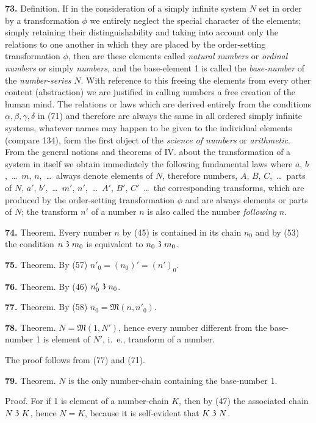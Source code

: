 \documentclass[oneside]{book}
\newcommand\partof{\mathrel{\raisebox{0.45ex}{$\mathfrak{3}$}}}   %
\newcommand\mypara{\medskip\textbf}
\begin{document}
\mypara{73.} Definition. If in the consideration of a simply
infinite system $N$ set in order by a transformation $\phi$
we entirely neglect the special character of the elements;
simply retaining their distinguishability and
taking into account only the relations to one another
in which they are placed by the order-setting transformation
$\phi$, then are these elements called \textit{natural
numbers} or \textit{ordinal numbers} or simply \textit{numbers}, and the
base-element 1 is called the \textit{base-number} of the \textit{number-series}
$N$. With reference to this freeing the elements
from every other content (abstraction) we are justified
in calling numbers a free creation of the human mind.
The relations or laws which are derived entirely from
the conditions $\alpha, \beta, \gamma, \delta$ in (71) and therefore are always
the same in all ordered simply infinite systems,
whatever names may happen to be given to the individual
elements (compare 134), form the first object of
the \textit{science of numbers} or \textit{arithmetic}. From the general
notions and theorems of IV. about the transformation
of a system in itself we obtain immediately the following
fundamental laws where $a$, $b$,~\ldots\ $m$, $n$,~\ldots\ always
denote elements of $N$, therefore numbers, $A$, $B$, $C$,~\ldots\
parts of $N$, $a'$, $b'$,~\ldots\ $m'$, $n'$,~\ldots\ $A'$, $B'$, $C'$~\ldots\ the
corresponding transforms, which are produced by the
order-setting transformation $\phi$ and are always elements
or parts of $N$; the transform $n'$ of a number $n$
is also called the number \textit{following} $n$.

\mypara{74.} Theorem.  Every number $n$ by (45) is contained
in its chain $n_0$ and by (53) the condition $n \partof m_0$
is equivalent to $n_0 \partof m_0$.

\mypara{75.} Theorem. By (57) $n'_0=(n_0)'=(n')_0$.

\mypara{76.} Theorem. By (46) $n'_0 \partof n_0$.

\mypara{77.} Theorem. By (58) $n_0 = \mathfrak{M}(n,n'_0)$.

\mypara{78.} Theorem. $N = \mathfrak{M}(1,N')$, hence every number
different from the base-number 1 is element of $N'$,
i.~e., transform of a number.

The proof follows from (77) and (71).

\mypara{79.} Theorem. $N$ is the only number-chain containing
the base-number 1.

Proof. For if 1 is element of a number-chain $K$,
then by (47) the associated chain $N \partof K$, hence $N=K$,
because it is self-evident that $K \partof N$.
\end{document}

